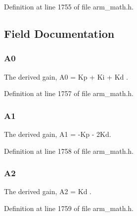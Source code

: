 Definition at line 1755 of file arm\+\_\+math.\+h.



\subsection{Field Documentation}
\subsubsection[{\texorpdfstring{A0}{A0}}]{ A0}\hypertarget{structarm__pid__instance__q31_ab58496a4137da4c667915a5fc0ef57ef}{}\label{structarm__pid__instance__q31_ab58496a4137da4c667915a5fc0ef57ef}
The derived gain, A0 = Kp + Ki + Kd . 

Definition at line 1757 of file arm\+\_\+math.\+h.

\subsubsection[{\texorpdfstring{A1}{A1}}]{ A1}\hypertarget{structarm__pid__instance__q31_aeb897c84724b56948e4222aca8d0e1f4}{}\label{structarm__pid__instance__q31_aeb897c84724b56948e4222aca8d0e1f4}
The derived gain, A1 = -\/\+Kp -\/ 2\+Kd. 

Definition at line 1758 of file arm\+\_\+math.\+h.

\subsubsection[{\texorpdfstring{A2}{A2}}]{ A2}\hypertarget{structarm__pid__instance__q31_a4ae945f839719fb2c04c978724b78ebb}{}\label{structarm__pid__instance__q31_a4ae945f839719fb2c04c978724b78ebb}
The derived gain, A2 = Kd . 

Definition at line 1759 of file arm\+\_\+math.\+h.

